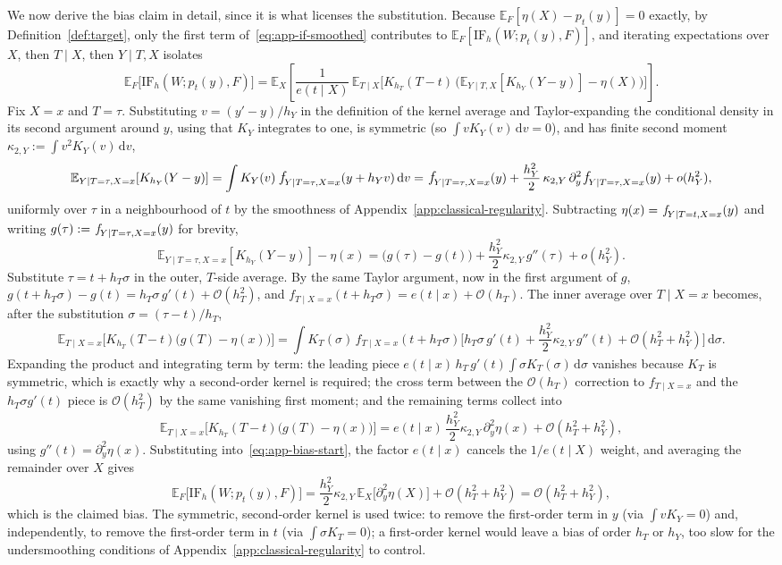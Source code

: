 \documentclass[11pt]{article}
\theoremstyle{plain}
\theoremstyle{definition}
\theoremstyle{remark}
\newcommand{\pE}{\ensuremath{\mathbb{E}}}
\newcommand{\pf}[1]{\ensuremath{\,\mathlarger{\textit{f}}_{#1}}}
\newcommand{\cO}{\mathcal{O}}
\newcommand{\dd}{\,\mathrm{d}}
\newcommand{\IF}{\mathrm{IF}}
\newcommand{\gps}{e}
\begin{document}
We now derive the bias claim in detail, since it is what licenses the substitution. Because
$\pE_F[\eta(X) - p_t(y)] = 0$ exactly, by Definition~\ref{def:target}, only the first term
of~\eqref{eq:app-if-smoothed} contributes to $\pE_F[\IF_h(W;p_t(y),F)]$, and iterating
expectations over $X$, then $T\mid X$, then $Y\mid T,X$ isolates
\begin{equation}
\pE_F\big[\IF_h(W;p_t(y),F)\big]
= \pE_X\!\left[ \frac{1}{\gps(t\mid X)}\,
\pE_{T\mid X}\Big[ K_{h_T}(T-t)\,\big(\pE_{Y\mid T,X}[K_{h_Y}(Y-y)] - \eta(X)\big) \Big] \right].
\label{eq:app-bias-start}
\end{equation}
Fix $X=x$ and $T=\tau$. Substituting $v=(y'-y)/h_Y$ in the definition of the kernel average and
Taylor-expanding the conditional density in its second argument around $y$, using that $K_Y$
integrates to one, is symmetric (so $\int v K_Y(v)\dd v = 0$), and has finite second moment
$\kappa_{2,Y} := \int v^2 K_Y(v)\dd v$,
\[
\pE_{Y\mid T=\tau,X=x}[K_{h_Y}(Y-y)]
= \int K_Y(v)\,\pf{Y\mid T=\tau,X=x}(y+h_Yv)\dd v
= \pf{Y\mid T=\tau,X=x}(y) + \frac{h_Y^2}{2}\,\kappa_{2,Y}\,\partial_y^2 \pf{Y\mid T=\tau,X=x}(y)
+ o(h_Y^2),
\]
uniformly over $\tau$ in a neighbourhood of $t$ by the smoothness of Appendix~\ref{app:classical-regularity}.
Subtracting $\eta(x) = \pf{Y\mid T=t,X=x}(y)$ and writing $g(\tau) := \pf{Y\mid T=\tau,X=x}(y)$
for brevity,
\[
\pE_{Y\mid T=\tau,X=x}[K_{h_Y}(Y-y)] - \eta(x)
= \big( g(\tau) - g(t) \big) + \frac{h_Y^2}{2}\kappa_{2,Y}\,g''(\tau) + o(h_Y^2).
\]
Substitute $\tau = t + h_T\sigma$ in the outer, $T$-side average. By the same Taylor argument,
now in the first argument of $g$, $g(t+h_T\sigma) - g(t) = h_T\sigma\,g'(t) + \cO(h_T^2)$, and
$f_{T\mid X=x}(t+h_T\sigma) = \gps(t\mid x) + \cO(h_T)$. The inner average over $T\mid X=x$
becomes, after the substitution $\sigma = (\tau-t)/h_T$,
\[
\pE_{T\mid X=x}\Big[ K_{h_T}(T-t)\big(g(T)-\eta(x)\big) \Big]
= \int K_T(\sigma)\, f_{T\mid X=x}(t+h_T\sigma)
\Big[ h_T\sigma\,g'(t) + \frac{h_Y^2}{2}\kappa_{2,Y}\,g''(t) + \cO(h_T^2+h_Y^2) \Big] \dd\sigma .
\]
Expanding the product and integrating term by term: the leading piece
$\gps(t\mid x)\,h_T\,g'(t)\int\sigma K_T(\sigma)\dd\sigma$ vanishes because $K_T$ is symmetric,
which is exactly why a second-order kernel is required; the cross term between the $\cO(h_T)$
correction to $f_{T\mid X=x}$ and the $h_T\sigma g'(t)$ piece is $\cO(h_T^2)$ by the same
vanishing first moment; and the remaining terms collect into
\[
\pE_{T\mid X=x}\Big[ K_{h_T}(T-t)\big(g(T)-\eta(x)\big) \Big]
= \gps(t\mid x)\,\frac{h_Y^2}{2}\kappa_{2,Y}\,\partial_y^2\eta(x) + \cO(h_T^2+h_Y^2),
\]
using $g''(t) = \partial_y^2\eta(x)$. Substituting into~\eqref{eq:app-bias-start}, the factor
$\gps(t\mid x)$ cancels the $1/\gps(t\mid X)$ weight, and averaging the remainder over $X$
gives
\[
\pE_F\big[\IF_h(W;p_t(y),F)\big]
= \frac{h_Y^2}{2}\kappa_{2,Y}\,\pE_X\big[\partial_y^2\eta(X)\big] + \cO(h_T^2+h_Y^2)
= \cO(h_T^2+h_Y^2),
\]
which is the claimed bias. The symmetric, second-order kernel is used twice: to remove the
first-order term in $y$ (via $\int vK_Y=0$) and, independently, to remove the first-order term
in $t$ (via $\int\sigma K_T=0$); a first-order kernel would leave a bias of order $h_T$ or
$h_Y$, too slow for the undersmoothing conditions of Appendix~\ref{app:classical-regularity} to
control.
\end{document}
